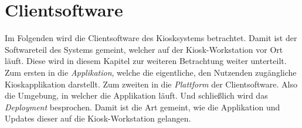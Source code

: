 \section{Clientsoftware}
\label{sec:frontend}

\iffalse
- viele Anforderungen
- Fokus der Thesis
- beschreibt alle Schritte um eine Webandwendung in eine gelunge Kioskapplikation zu bringen
- Was meint Frontend: die eigentliche Kioskapplikation, Plattform: die Umgebung der Applikation, Deployment der Applikation
- SPA Routing im Frontend
- rein mit Webtechnologien, und noch weiter rein mit Browsertechnologien: beschränken auf HTML, CSS und JS
- mit Electron bindet man sich an die Plattform
\fi

Im Folgenden wird die Clientsoftware des Kiosksystems betrachtet. Damit ist der 
Softwareteil des Systems gemeint, welcher auf der Kiosk-Workstation vor 
Ort läuft. Diese wird in diesem Kapitel zur weiteren Betrachtung 
weiter unterteilt. Zum ersten in die \emph{Applikation}, 
welche die eigentliche, den Nutzenden zugängliche Kioskapplikation darstellt.
Zum zweiten in die \emph{Plattform} der Clientsoftware.
Also die Umgebung, in welcher die Applikation läuft.
Und schließlich wird das \emph{Deployment} besprochen. Damit ist die Art gemeint,
wie die Applikation und Updates dieser auf die Kiosk-Workstation gelangen.\\




